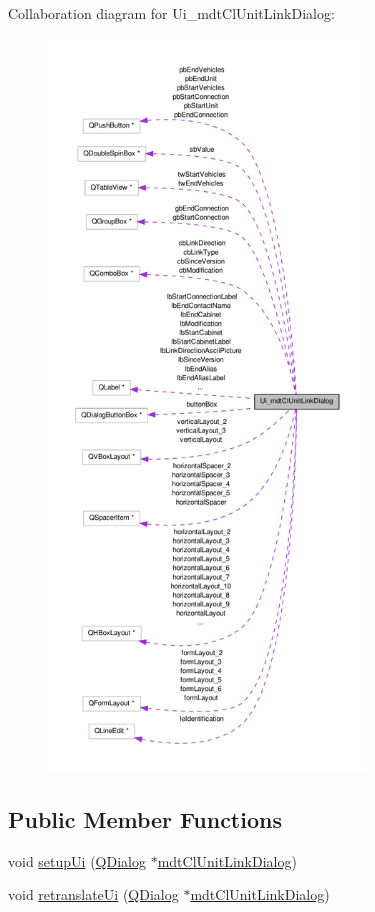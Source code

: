 Collaboration diagram for Ui\-\_\-mdt\-Cl\-Unit\-Link\-Dialog\-:\nopagebreak
\begin{figure}[H]
\begin{center}
\leavevmode
\includegraphics[height=550pt]{class_ui__mdt_cl_unit_link_dialog__coll__graph}
\end{center}
\end{figure}
\subsection*{Public Member Functions}
\begin{DoxyCompactItemize}
\item 
void \hyperlink{class_ui__mdt_cl_unit_link_dialog_aa2310fe0eeed6b9b24a590ae2d314f9b}{setup\-Ui} (\hyperlink{class_q_dialog}{Q\-Dialog} $\ast$\hyperlink{classmdt_cl_unit_link_dialog}{mdt\-Cl\-Unit\-Link\-Dialog})
\item 
void \hyperlink{class_ui__mdt_cl_unit_link_dialog_a9d163ec0f9fa2241d276d1e6e4b77246}{retranslate\-Ui} (\hyperlink{class_q_dialog}{Q\-Dialog} $\ast$\hyperlink{classmdt_cl_unit_link_dialog}{mdt\-Cl\-Unit\-Link\-Dialog})
\end{DoxyCompactItemize}
